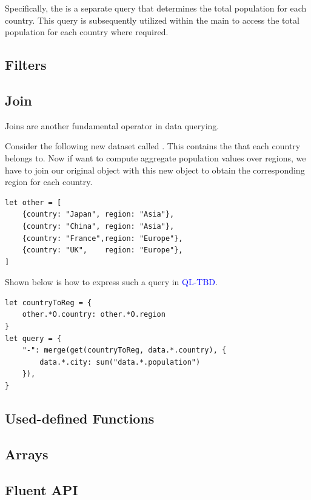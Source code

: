\documentclass[runningheads]{llncs}
\newcommand{\lang}{\textcolor{blue}{QL-TBD}}
\begin{document}
Specifically, the  is a separate query that determines the total
population for each country.
This query is subsequently utilized within the main  to access the
total population for each country where required.



\subsection{Filters}

\subsection{Join}
Joins are another fundamental operator in data querying.

Consider the following new dataset called .
This contains the  that each country belongs to.
Now if want to compute aggregate population values over regions, we
have to join our original  object with this new object
to obtain the corresponding region for each country.

\begin{lstlisting}[style=JavaScript]
let other = [
    {country: "Japan", region: "Asia"},
    {country: "China", region: "Asia"},
    {country: "France",region: "Europe"},
    {country: "UK",    region: "Europe"},
]
\end{lstlisting}

Shown below is how to express such a query in \lang{}.

\begin{lstlisting}[style=JavaScript, columns=flexible]
let countryToReg = {
    other.*O.country: other.*O.region
}
let query = {
    "-": merge(get(countryToReg, data.*.country), {
        data.*.city: sum("data.*.population")
    }),
}
\end{lstlisting}


\subsection{Used-defined Functions}
\subsection{Arrays}
\subsection{Fluent API}
\end{document}
